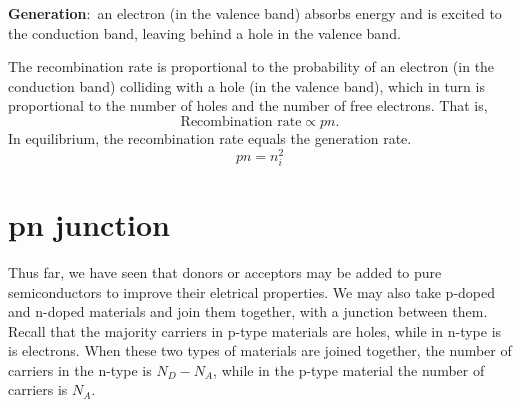\documentclass[nobib]{tufte-handout}
\newcommand{\defn}[2]{\noindent\textbf{#1}:\ #2}
\begin{document}
\defn{Generation}{an electron (in the
valence band) absorbs energy and is
excited to the conduction band, leaving
behind a hole in the valence band}.

The recombination rate is proportional to the probability of an electron
(in the conduction band) colliding with a hole (in the valence band), 
which in turn is proportional to the number of holes and the number 
of free electrons. 
That is, 
\[\text{Recombination rate} \propto pn.\]
In equilibrium, the recombination rate equals the 
generation rate.
\[pn = n_i^2\]

\section{pn junction}

Thus far, we have seen that donors or acceptors may be added 
to pure semiconductors to improve their eletrical properties. 
We may also take p-doped and n-doped materials and join them 
together, with a junction between them. Recall that the majority 
carriers in p-type materials are holes, while in n-type is is 
electrons. When these two types of materials are joined together, 
the number of carriers in the n-type is $N_D-N_A$, while in 
the p-type material the number of carriers is $N_A$. 
\end{document}
